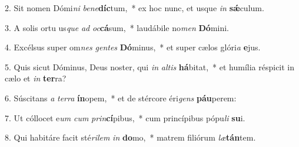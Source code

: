 2. Sit nomen Dómi\textit{ni} \textit{be}\textit{ne}\textbf{díc}tum,~*  ex hoc nunc, et usque \textit{in} \textbf{sǽ}culum.\

3. A solis ortu us\textit{que} \textit{ad} \textit{oc}\textbf{cá}sum,~*  laudábile no\textit{men} \textbf{Dó}mini.\

4. Excélsus super om\textit{nes} \textit{gen}\textit{tes} \textbf{Dó}minus,~*  et super cælos glóri\textit{a} \textbf{e}jus.\

5. Quis sicut Dóminus, Deus noster, qui \textit{in} \textit{al}\textit{tis} \textbf{há}bitat,~*  et humília réspicit in cælo et \textit{in} \textbf{ter}ra?\

6. Súscitans \textit{a} \textit{ter}\textit{ra} \textbf{ín}opem,~*  et de stércore éri\textit{gens} \textbf{páu}perem:\

7. Ut cóllocet e\textit{um} \textit{cum} \textit{prin}\textbf{cí}pibus,~*  cum princípibus pópu\textit{li} \textbf{su}i.\

8. Qui habitáre facit sté\textit{ri}\textit{lem} \textit{in} \textbf{do}mo,~*  matrem filiórum \textit{læ}\textbf{tán}tem.\

